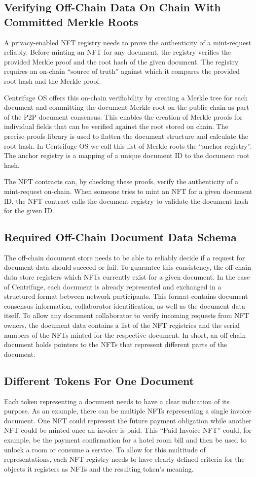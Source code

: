 \documentclass[a4paper, 10pt]{article}
\begin{document}
\subsection{Verifying Off-Chain Data On Chain With Committed Merkle Roots}
A privacy-enabled NFT registry needs to prove the authenticity of a mint-request reliably. Before minting an NFT for any document, the registry verifies the provided Merkle proof and the root hash of the given document. The registry requires an on-chain “source of truth” against which it compares the provided root hash and the Merkle proof.

Centrifuge OS offers this on-chain verifiability by creating a Merkle tree for each document and committing the document Merkle root on the public chain as part of the P2P document consensus. This enables the creation of Merkle proofs for individual fields that can be verified against the root stored on chain. The precise-proofs library is used to flatten the document structure and calculate the root hash. In Centrifuge OS we call this list of Merkle roots the “anchor registry”. The anchor registry is a mapping of a unique document ID to the document root hash. 

The NFT contracts can, by checking these proofs, verify the authenticity of a mint-request on-chain. When someone tries to mint an NFT for a given document ID, the NFT contract calls the document registry to validate the document hash for the given ID.

\subsection{Required Off-Chain Document Data Schema}
The off-chain document store needs to be able to reliably decide if a request for document data should succeed or fail. To guarantee this consistency, the off-chain data store registers which NFTs currently exist for a given document. In the case of Centrifuge, each document is already represented and exchanged in a structured format between network participants. This format contains document consensus information, collaborator identification, as well as the document data itself. To allow any document collaborator to verify incoming requests from NFT owners, the document data contains a list of the NFT registries and the serial numbers of the NFTs minted for the respective document. In short, an off-chain document holds pointers to the NFTs that represent different parts of the document. 
\subsection{Different Tokens For One Document}
Each token representing a document needs to have a clear indication of its purpose. As an example, there can be multiple NFTs representing a single invoice document. One NFT could represent the future payment obligation while another NFT could be minted once an invoice is paid. This “Paid Invoice NFT” could, for example, be the payment confirmation for a hotel room bill and then be used to unlock a room or consume a service. To allow for this multitude of representations, each NFT registry needs to have clearly defined criteria for the objects it registers as NFTs and the resulting token’s meaning.
 
\end{document}
